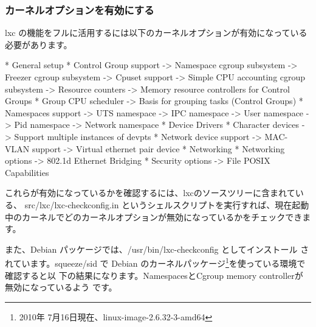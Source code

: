 \documentclass[mingoth,a4paper]{jsarticle}
\begin{document}
\subsubsection{カーネルオプションを有効にする}
lxc の機能をフルに活用するには以下のカーネルオプションが有効になっている
必要があります。

\begin{commandline}
* General setup
  * Control Group support
    -> Namespace cgroup subsystem
    -> Freezer cgroup subsystem
    -> Cpuset support
    -> Simple CPU accounting cgroup subsystem
    -> Resource counters
      -> Memory resource controllers for Control Groups
  * Group CPU scheduler
    -> Basis for grouping tasks (Control Groups)
  * Namespaces support
    -> UTS namespace
    -> IPC namespace
    -> User namespace
    -> Pid namespace
    -> Network namespace
* Device Drivers
  * Character devices
    -> Support multiple instances of devpts
  * Network device support
    -> MAC-VLAN support
    -> Virtual ethernet pair device
* Networking
  * Networking options
    -> 802.1d Ethernet Bridging
* Security options
  -> File POSIX Capabilities
\end{commandline}

これらが有効になっているかを確認するには、lxcのソースツリーに含まれている、
src/lxc/lxc-checkconfig.in というシェルスクリプトを実行すれば、現在起動
中のカーネルでどのカーネルオプションが無効になっているかをチェックできま
す。

また、Debian パッケージでは、/usr/bin/lxc-checkconfig としてインストール
されています。squeeze/sid で Debian のカーネルパッケージ\footnote{2010年
7月16日現在、linux-image-2.6.32-3-amd64}を使っている環境で確認すると以
下の結果になります。NamespacesとCgroup memory controllerが無効になっているよう
です。

\end{document}
